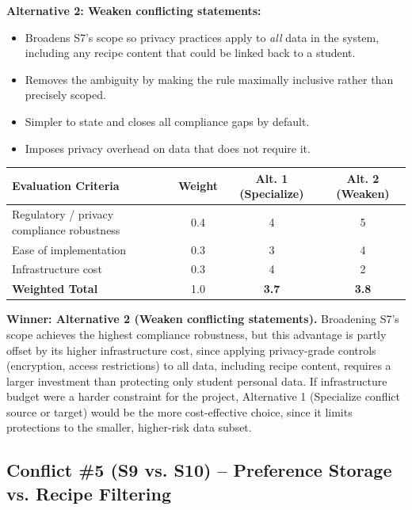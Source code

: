 \documentclass[11pt]{article}
\begin{document}
\textbf{Alternative 2: Weaken conflicting statements:}
\begin{itemize}[leftmargin=1.5em]
  \item Broadens S7's scope so privacy practices apply to \textit{all} data in the system, including any recipe content that could be linked back to a student.
  \item Removes the ambiguity by making the rule maximally inclusive rather than precisely scoped.
  \item Simpler to state and closes all compliance gaps by default.
  \item Imposes privacy overhead on data that does not require it.
\end{itemize}

\begin{table}[H]
\centering
\small
\renewcommand{\arraystretch}{1.3}
\begin{tabular}{|p{4cm}|c|c|c|}
\hline
\textbf{Evaluation Criteria} & \textbf{Weight} & \textbf{Alt. 1 (Specialize)} & \textbf{Alt. 2 (Weaken)} \\
\hline
Regulatory / privacy compliance robustness & 0.4 & 4 & 5 \\
\hline
Ease of implementation & 0.3 & 3 & 4 \\
\hline
Infrastructure cost & 0.3 & 4 & 2 \\
\hline
\hline
\textbf{Weighted Total} & 1.0 & \textbf{3.7} & \textbf{3.8} \\
\hline
\end{tabular}
\end{table}

\textbf{Winner: Alternative 2 (Weaken conflicting statements).} Broadening S7's scope achieves the highest compliance robustness, but this advantage is partly offset by its higher infrastructure cost, since applying privacy-grade controls (encryption, access restrictions) to all data, including recipe content, requires a larger investment than protecting only student personal data. If infrastructure budget were a harder constraint for the project, Alternative 1 (Specialize conflict source or target) would be the more cost-effective choice, since it limits protections to the smaller, higher-risk data subset.

\subsection*{Conflict \#5 (S9 vs. S10) -- Preference Storage vs. Recipe Filtering}
\end{document}
